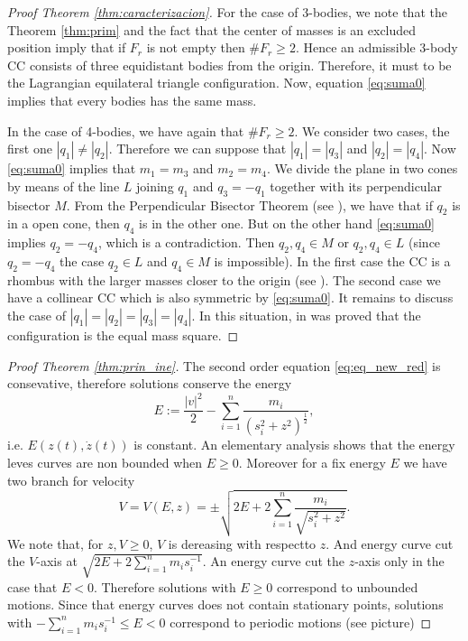 \documentclass[twoside]{article}
\theoremstyle{remark}
\begin{document}
\begin{proof}[Proof Theorem \ref{thm:caracterizacion}]
For the case of 3-bodies, we note that the Theorem \ref{thm:prim} and the fact that the center of masses is an excluded position imply that if $F_r$ is not empty then $\# F_r\geq 2$. Hence an admissible 3-body CC consists of three equidistant bodies from the origin. Therefore, it must to be the Lagrangian equilateral triangle configuration. Now, equation \eqref{eq:suma0} implies that every bodies has the same mass.

In the case of 4-bodies, we have again that $\# F_r\geq 2$.  We consider two cases, the first one  $|q_1|\neq|q_2|$.  Therefore we can suppose that $|q_1|=|q_3|$ and $|q_2|=|q_4|$. Now \eqref{eq:suma0} implies that
 $m_1=m_3$ and $m_2=m_4$.  We divide the plane in two cones by means of  the line $L$ joining $q_1$  and $q_3=-q_1$ together with its perpendicular bisector $M$.  From the Perpendicular Bisector Theorem (see \cite{moeckel1990central}), we have that if  $q_2$  is in a open cone, then  $q_4$ is in the other one. But on the other hand \eqref{eq:suma0} implies $q_2=-q_4$, which is a contradiction. Then $q_2,q_4\in M$ or $q_2,q_4\in L$ (since $q_2=-q_4$ the case $q_2\in L$ and $q_4\in M$ is impossible). In the first case the CC is a rhombus with the larger masses closer to the origin (see  \cite{perez2007convex}). The second case we have a collinear CC which is also symmetric by  \eqref{eq:suma0}.
 It remains to discuss the case of $|q_1|=|q_2|=|q_3|=|q_4|$. In this situation, in \cite{hampton2005co} was proved that the configuration is the equal mass square.
\end{proof}


\begin{proof}[Proof Theorem \ref{thm:prin_ine}]
The second order equation \eqref{eq:eq_new_red} is consevative, therefore solutions conserve the energy
\begin{equation}\label{eq:conser.energ}
E:=\frac{|v|^2}{2}-\sum_{i=1}^{n} \frac{m_i}{\left(s_i^2+z^2\right)^{\frac12}},
\end{equation}
i.e. $E(z(t),\dot{z}(t))$ is constant. An elementary analysis shows that the energy leves curves are non bounded when $E\geq 0$. Moreover for a fix energy $E$ we have two branch for velocity
\[V=V(E,z)=\pm \sqrt{2E+2\sum_{i=1}^n\frac{m_i}{\sqrt{s_i^2+z^2}}}.\]
We note that,  for $z,V\geq 0$, $V$ is dereasing with respectto $z$. And energy curve cut the $V$-axis at $\sqrt{2E+2\sum_{i=1}^n m_is_i^{-1}}$. An energy curve cut the $z$-axis only in the case that $E<0$. Therefore solutions with $E\geq 0$ correspond to unbounded motions.  Since that energy curves does not contain stationary points, solutions with $-\sum_{i=1}^n m_is_i^{-1}\leq E<0$ correspond to periodic motions (see picture)


\end{proof}
\end{document}
